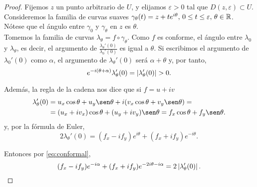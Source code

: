 \begin{proof}
    Fijemos $z$ un punto arbitrario de $U$, y elijamos $\varepsilon > 0$ tal que $D(z, \varepsilon) \subset U$. Consideremos la familia de curvas suaves $\gamma_{\theta}(t) = z + te^{i \theta}, \, 0 \leq t \leq \varepsilon, \, \theta \in \mathbb{R}$. Nótese que el ángulo entre $\gamma_0$ y $\gamma_{\theta}$ en $z$ es $\theta$. \\

     Tomemos la familia de curvas $\lambda_\theta = f \circ \gamma_\theta$. Como $f$ es conforme, el ángulo entre $\lambda_0$ y $\lambda_{\theta}$, es decir, el argumento de $\frac{\lambda_{\theta}'(0)}{\lambda_0' (0)}$ es igual a $\theta$. Si escribimos el argumento de $\lambda_0'(0)$ como $\alpha$, el argumento de $\lambda_{\theta}'(0)$ será $\alpha+\theta$ y, por tanto,
    \begin{equation}
    \label{eq:conformal}
        e^{-i(\theta + \alpha)} \lambda_{\theta}'(0)= \left\lvert\lambda_{\theta}'(0)\right\rvert > 0.
    \end{equation}

    Además, la regla de la cadena nos dice que si $f = u + iv$
    \begin{equation}
        \begin{split}
        \label{eq:nonulo}
            \lambda_{\theta}'(0) & = u_x \cos \theta + u_y \sen \theta + i(v_x \cos \theta + v_y \sen \theta) = \\
                             & = (u_x + iv_x) \cos \theta + (u_y + i v_y) \sen \theta = f_x \cos \theta + f_y \sen \theta.
        \end{split}
    \end{equation}
    y, por la fórmula de Euler, %
    \begin{equation*}
        2 \lambda_{\theta}'(0) = (f_x - i f_y) e^{i \theta} + (f_x + i f_y) e^{-i \theta}.
    \end{equation*}

    Entonces por \eqref{eq:conformal}, %
    \begin{equation*}
         (f_x - i f_y) e^{-i \alpha} + (f_x + i f_y) e^{-2i \theta -i  \alpha} = 2 \left\lvert\lambda_{\theta}'(0)\right\rvert.
    \end{equation*}


\end{proof}
